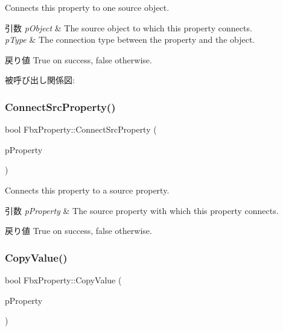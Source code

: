Connects this property to one source object. 
\begin{DoxyParams}{引数}
{\em p\+Object} & The source object to which this property connects. \\
\hline
{\em p\+Type} & The connection type between the property and the object. \\
\hline
\end{DoxyParams}
\begin{DoxyReturn}{戻り値}
{\ttfamily True} on success, {\ttfamily false} otherwise. 
\end{DoxyReturn}
被呼び出し関係図\+:
\mbox{\label{class_fbx_property_aeeed658a70181e4bd6030c516065eb03}} 
\subsubsection{\texorpdfstring{Connect\+Src\+Property()}{ConnectSrcProperty()}}
{\footnotesize\ttfamily bool Fbx\+Property\+::\+Connect\+Src\+Property (\begin{DoxyParamCaption}\item[{const \hyperlink{class_fbx_property}{Fbx\+Property} \&}]{p\+Property }\end{DoxyParamCaption})}

Connects this property to a source property. 
\begin{DoxyParams}{引数}
{\em p\+Property} & The source property with which this property connects. \\
\hline
\end{DoxyParams}
\begin{DoxyReturn}{戻り値}
{\ttfamily True} on success, {\ttfamily false} otherwise. 
\end{DoxyReturn}
\mbox{\label{class_fbx_property_aadee6392924e168e7cfea5225148893a}} 
\subsubsection{\texorpdfstring{Copy\+Value()}{CopyValue()}}
{\footnotesize\ttfamily bool Fbx\+Property\+::\+Copy\+Value (\begin{DoxyParamCaption}\item[{const \hyperlink{class_fbx_property}{Fbx\+Property} \&}]{p\+Property }\end{DoxyParamCaption})}

